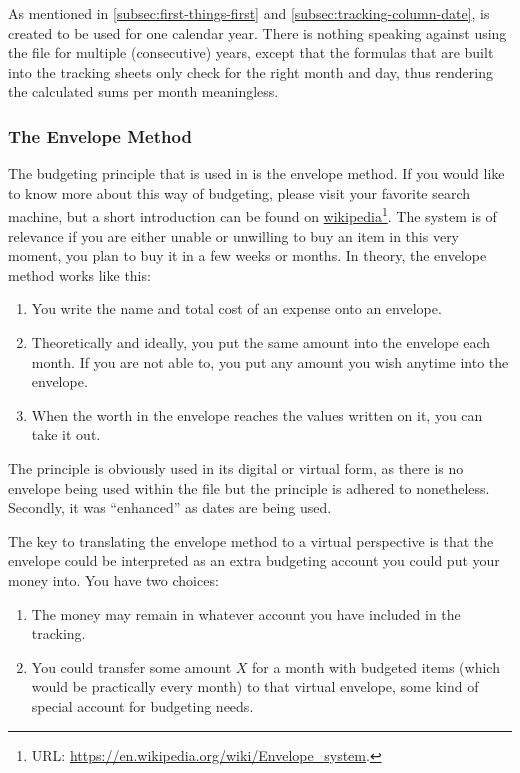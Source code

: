 As mentioned in \autoref{subsec:first-things-first} and \autoref{subsec:tracking-column-date}, \tfn is created to be used for one calendar year.
There is nothing speaking against using the file for multiple (consecutive) years, except that the formulas that are built into the tracking sheets only check for the right month and day, thus rendering the calculated sums per month meaningless.

\subsubsection{The Envelope Method}
\label{subsubsec:budgeting-the-envelope-method}

The budgeting principle that is used in \tfn is the envelope method.
If you would like to know more about this way of budgeting, please visit your favorite search machine, but a short introduction can be found on \href{https://en.wikipedia.org/wiki/Envelope_system}{wikipedia}\footnote{URL: \href{https://en.wikipedia.org/wiki/Envelope_system}{https://en.wikipedia.org/wiki/Envelope{\_}system}.}.
The system is of relevance if you are either unable or unwilling to buy an item in this very moment, \ie you plan to buy it in a few weeks or months.
In theory, the envelope method works like this:
\begin{enumerate}
	\item You write the name and total cost of an expense onto an envelope.
	\item Theoretically and ideally, you put the same amount into the envelope each month.
	If you are not able to, you put any amount you wish anytime into the envelope.
	\item When the worth in the envelope reaches the values written on it, you can take it out.
\end{enumerate}

The principle is obviously used in its digital or virtual form, as there is no envelope being used within the file but the principle is adhered to nonetheless.
Secondly, it was ``enhanced'' as dates are being used.

The key to translating the envelope method to a virtual perspective is that the envelope could be interpreted as an extra budgeting account you could put your money into.
You have two choices:
\begin{enumerate}
	\item The money may remain in whatever account you have included in the tracking.
	\item You could transfer some amount \( X \) for a month with budgeted items (which would be practically every month) to that virtual envelope, \ie some kind of special account for budgeting needs.
\end{enumerate}


